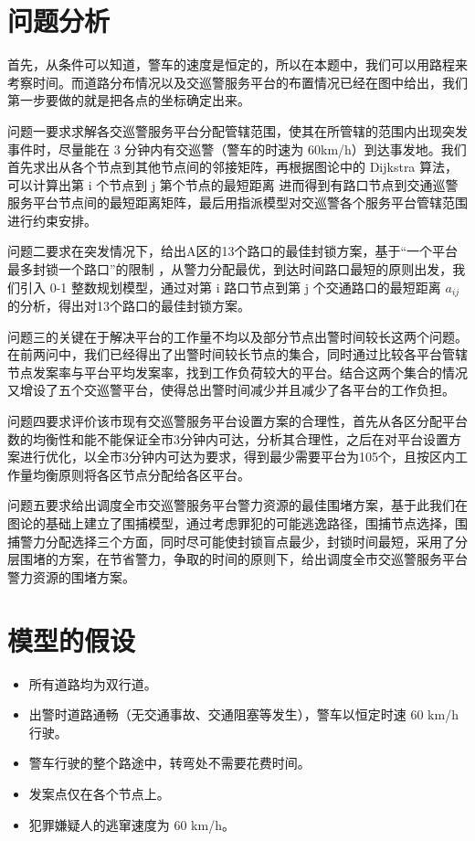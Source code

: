 \documentclass{cumcmthesis}
\begin{document}
\section{问题分析}

  首先，从条件可以知道，警车的速度是恒定的，所以在本题中，我们可以用路程来考察时间。而道路分布情况以及交巡警服务平台的布置情况已经在图中给出，我们第一步要做的就是把各点的坐标确定出来。

  问题一要求求解各交巡警服务平台分配管辖范围，使其在所管辖的范围内出现突发事件时，尽量能在 3 分钟内有交巡警（警车的时速为 60km/h）到达事发地。我们首先求出从各个节点到其他节点间的邻接矩阵，再根据图论中的 Dijkstra 算法，可以计算出第 i 个节点到 j 第个节点的最短距离 进而得到有路口节点到交通巡警服务平台节点间的最短距离矩阵，最后用指派模型对交巡警各个服务平台管辖范围进行约束安排。

  问题二要求在突发情况下，给出A区的13个路口的最佳封锁方案，基于“一个平台最多封锁一个路口”的限制 ，从警力分配最优，到达时间路口最短的原则出发，我们引入 0-1 整数规划模型，通过对第 i 路口节点到第 j 个交通路口的最短距离 $a_{ij}$的分析，得出对13个路口的最佳封锁方案。

  问题三的关键在于解决平台的工作量不均以及部分节点出警时间较长这两个问题。在前两问中，我们已经得出了出警时间较长节点的集合，同时通过比较各平台管辖节点发案率与平台平均发案率，找到工作负荷较大的平台。结合这两个集合的情况又增设了五个交巡警平台，使得总出警时间减少并且减少了各平台的工作负担。

  问题四要求评价该市现有交巡警服务平台设置方案的合理性，首先从各区分配平台数的均衡性和能不能保证全市3分钟内可达，分析其合理性，之后在对平台设置方案进行优化，以全市3分钟内可达为要求，得到最少需要平台为105个，且按区内工作量均衡原则将各区节点分配给各区平台。

  问题五要求给出调度全市交巡警服务平台警力资源的最佳围堵方案，基于此我们在图论的基础上建立了围捕模型，通过考虑罪犯的可能逃逸路径，围捕节点选择，围捕警力分配选择三个方面，同时尽可能使封锁盲点最少，封锁时间最短，采用了分层围堵的方案，在节省警力，争取的时间的原则下，给出调度全市交巡警服务平台警力资源的围堵方案。


\section{模型的假设}
  \begin{itemize}
    \item 所有道路均为双行道。
    \item 出警时道路通畅（无交通事故、交通阻塞等发生），警车以恒定时速 60 km/h 行驶。
    \item 警车行驶的整个路途中，转弯处不需要花费时间。
    \item 发案点仅在各个节点上。
    \item 犯罪嫌疑人的逃窜速度为 60 km/h。
  \end{itemize}
\end{document}
